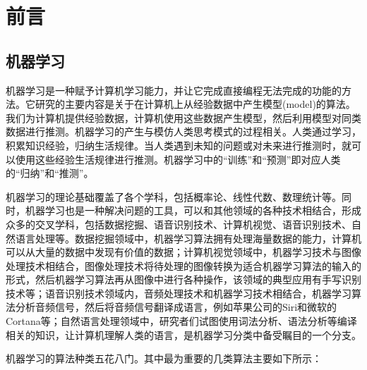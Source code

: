 
\chapter{前言}
\label{chap:preli}


\section{机器学习}

机器学习是一种赋予计算机学习能力，并让它完成直接编程无法完成的功能的方法。它研究的主要内容是关于在计算机上从经验数据中产生模型(model)的算法。我们为计算机提供经验数据，计算机使用这些数据产生模型，然后利用模型对同类数据进行推测。机器学习的产生与模仿人类思考模式的过程相关。人类通过学习，积累知识经验，归纳生活规律。当人类遇到未知的问题或对未来进行推测时，就可以使用这些经验生活规律进行推测。机器学习中的“训练”和“预测”即对应人类的“归纳”和“推测”。

机器学习的理论基础覆盖了各个学科，包括概率论、线性代数、数理统计等。同时，机器学习也是一种解决问题的工具，可以和其他领域的各种技术相结合，形成众多的交叉学科，包括数据挖掘、语音识别技术、计算机视觉、语音识别技术、自然语言处理等。数据挖掘领域中，机器学习算法拥有处理海量数据的能力，计算机可以从大量的数据中发现有价值的数据；计算机视觉领域中，机器学习技术与图像处理技术相结合，图像处理技术将待处理的图像转换为适合机器学习算法的输入的形式，然后机器学习算法再从图像中进行各种操作，该领域的典型应用有手写识别技术等；语音识别技术领域内，音频处理技术和机器学习技术相结合，机器学习算法分析音频信号，然后将音频信号翻译成语言，例如苹果公司的Siri和微软的Cortana等；自然语言处理领域中，研究者们试图使用词法分析、语法分析等编译相关的知识，让计算机理解人类的语言，是机器学习分类中备受瞩目的一个分支。

机器学习的算法种类五花八门。其中最为重要的几类算法主要如下所示：

